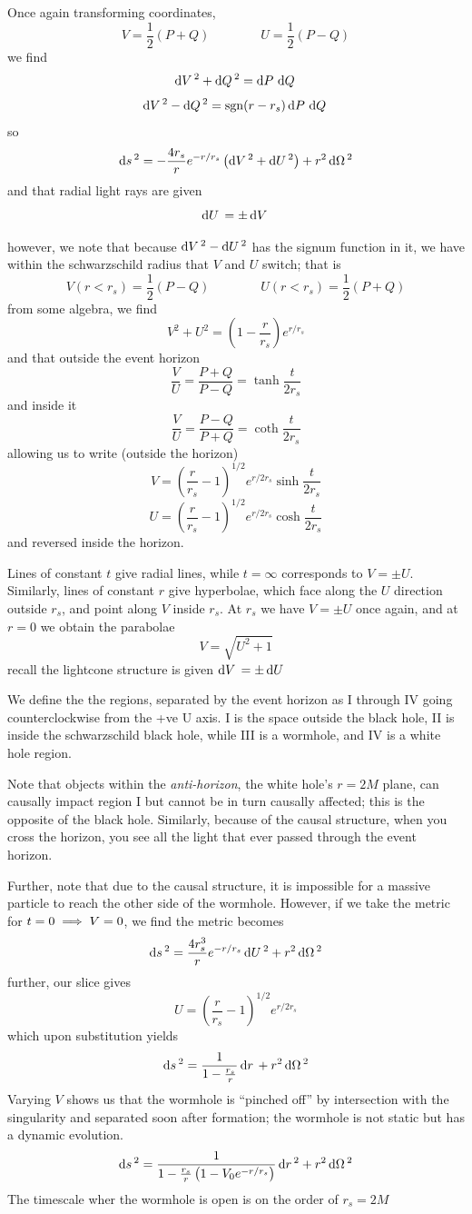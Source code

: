 Once again transforming coordinates,
\[V = \frac{1}{2}(P+Q) \qquad\qquad U = \frac{1}{2}(P-Q)\]
we find
\[\d{V}^2 + \d{Q}^2 = \d P\d Q\]
\[\d{V}^2 - \d Q ^2 = \sgn(r-r_s)\d P\d Q\]
so
\begin{equation}
\d{s}^2= -\frac{4r_s}{r}e^{-r/r_s}\left(\d{V}^2+\d{U}^2\right) + r^2\d\Omega^2
\end{equation}
and that radial light rays are given
\[\d{U} = \pm\d{V}\]

however, we note that because \(\d{V}^2-\d{U}^2\) has the signum function in it, we have within the schwarzschild radius that \(V\) and \(U\) switch; that is
\[V(r<r_s) = \frac{1}{2}(P-Q)\qquad \qquad U(r<r_s) = \frac{1}{2}(P+Q)\]
from some algebra, we find
\[V^2+U^2 = \left(1-\frac{r}{r_s}\right)e^{r/r_s}\]
and that outside the event horizon
\[\frac{V}{U} = \frac{P+Q}{P-Q} = \tanh\frac{t}{2r_s}\]
and inside it
\[\frac{V}{U} = \frac{P-Q}{P+Q} = \coth\frac{t}{2r_s}\]
allowing us to write (outside the horizon)
\[V = \left(\frac{r}{r_s}-1\right)^{1/2}e^{r/2r_s}\sinh\frac{t}{2r_s}\]
\[U = \left(\frac{r}{r_s}-1\right)^{1/2}e^{r/2r_s}\cosh\frac{t}{2r_s}\]
and reversed inside the horizon.

Lines of constant \(t\) give radial lines, while \(t=\infty\) corresponds to \(V = \pm U\). Similarly, lines of constant \(r\) give hyperbolae, which face along the \(U\) direction outside \(r_s\), and point along \(V\) inside \(r_s\). At \(r_s\) we have \(V=\pm U\) once again, and at \(r=0\) we obtain the parabolae
\[V = \sqrt{U^2+1}\]
recall the lightcone structure is given \(\d{V} = \pm\d{U}\)

We define the the regions, separated by the event horizon as I through IV going counterclockwise from the +ve U axis. I is the space outside the black hole, II is inside the schwarzschild black hole, while III is a wormhole, and IV is a white hole region.

Note that objects within the \emph{anti-horizon}, the white hole's \(r=2M\) plane, can causally impact region I but cannot be in turn causally affected; this is the opposite of the black hole. Similarly, because of the causal structure, when you cross the horizon, you see all the light that ever passed through the event horizon.

Further, note that due to the causal structure, it is impossible for a massive particle to reach the other side of the wormhole. However, if we take the metric for \(t=0\implies V=0\), we find the metric becomes
\[\d{s}^2= \frac{4 r_s^3}{r}e^{-r/r_s}\d{U}^2 + r^2\d\Omega^2\]
further, our slice gives
\[U = \left(\frac{r}{r_s}-1\right)^{1/2} e^{r/2r_s}\]
which upon substitution yields
\[\d{s}^2 = \frac{1}{1-\frac{r_s}{r}}\d{r}+r^2\d\Omega^2\]
Varying \(V\) shows us that the wormhole is ``pinched off'' by intersection with the singularity and separated soon after formation; the wormhole is not static but has a dynamic evolution.
\[\d{s}^2 = \frac{1}{1-\frac{r_s}{r}\left(1-V_0 e^{-r/r_s}\right)}\d{r}^2+r^2\d\Omega^2\]
The timescale wher the wormhole is open is on the order of \(r_s=2M\)
